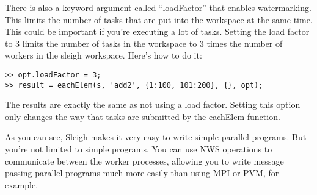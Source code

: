 There is also a keyword argument called ``loadFactor'' that enables
watermarking.  This limits the number of tasks that are put into the
workspace at the same time.  This could be important if you're executing
a lot of tasks.  Setting the load factor to 3 limits the number of tasks
in the workspace to 3 times the number of workers in the sleigh workspace.  
Here's how to do it:

\begin{samepage}
\begin{verbatim}
>> opt.loadFactor = 3;
>> result = eachElem(s, 'add2', {1:100, 101:200}, {}, opt);
\end{verbatim}
\end{samepage}

The results are exactly the same as not using a load factor.  Setting
this option only changes the way that tasks are submitted by the
eachElem function.

As you can see, Sleigh makes it very easy to write simple parallel
programs.  But you're not limited to simple programs. You can use NWS
operations to communicate between the worker processes, allowing you to
write message passing parallel programs much more easily than using MPI
or PVM, for example.
